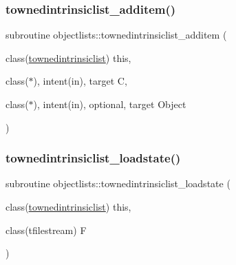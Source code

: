 \mbox{\label{namespaceobjectlists_a8a73104aaeee3be757486f8ed7ecf1af}} 
\subsubsection{\texorpdfstring{townedintrinsiclist\+\_\+additem()}{townedintrinsiclist\_additem()}}
{\footnotesize\ttfamily subroutine objectlists\+::townedintrinsiclist\+\_\+additem (\begin{DoxyParamCaption}\item[{class(\mbox{\hyperlink{structobjectlists_1_1townedintrinsiclist}{townedintrinsiclist}})}]{this,  }\item[{class($\ast$), intent(in), target}]{C,  }\item[{class($\ast$), intent(in), optional, target}]{Object }\end{DoxyParamCaption})\hspace{0.3cm}{\ttfamily [private]}}

\mbox{\label{namespaceobjectlists_a7b384ff8ee40c65239ebe5c1a7d239ff}} 
\subsubsection{\texorpdfstring{townedintrinsiclist\+\_\+loadstate()}{townedintrinsiclist\_loadstate()}}
{\footnotesize\ttfamily subroutine objectlists\+::townedintrinsiclist\+\_\+loadstate (\begin{DoxyParamCaption}\item[{class(\mbox{\hyperlink{structobjectlists_1_1townedintrinsiclist}{townedintrinsiclist}})}]{this,  }\item[{class(tfilestream)}]{F }\end{DoxyParamCaption})\hspace{0.3cm}{\ttfamily [private]}}

\mbox{\label{namespaceobjectlists_ab634ab92805c172a136d35becaf7601b}} 
